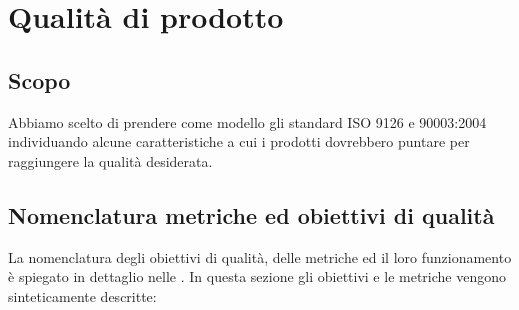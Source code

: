 
\section{Qualità di prodotto}\label{qualità di prodotto}

\subsection{Scopo}
Abbiamo scelto di prendere come modello gli standard ISO 9126 e 90003:2004 individuando alcune caratteristiche a cui i prodotti dovrebbero puntare per raggiungere la qualità desiderata.

\subsection{Nomenclatura metriche ed obiettivi di qualità}	\label{nomenclaturaprodotti}
La nomenclatura degli obiettivi di qualità, delle metriche ed il loro funzionamento è spiegato in dettaglio nelle \NdP. In questa sezione gli obiettivi e le metriche vengono sinteticamente descritte:

